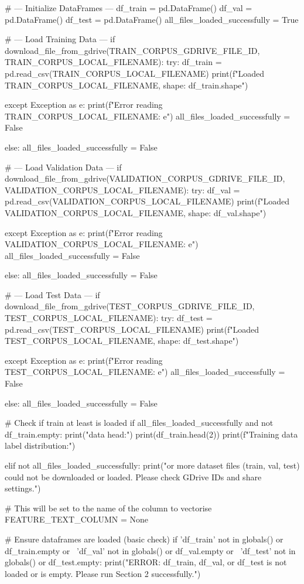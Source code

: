 \begin{ffcode}
# --- Initialize DataFrames ---
df_train = pd.DataFrame()
df_val = pd.DataFrame()
df_test = pd.DataFrame()
all_files_loaded_successfully = True

# --- Load Training Data ---
if download_file_from_gdrive(TRAIN_CORPUS_GDRIVE_FILE_ID, TRAIN_CORPUS_LOCAL_FILENAME):
    try:
        df_train = pd.read_csv(TRAIN_CORPUS_LOCAL_FILENAME)
        print(f"Loaded {TRAIN_CORPUS_LOCAL_FILENAME}, shape: {df_train.shape}")

    except Exception as e:
        print(f"Error reading {TRAIN_CORPUS_LOCAL_FILENAME}: {e}")
        all_files_loaded_successfully = False

else:
    all_files_loaded_successfully = False

# --- Load Validation Data ---
if download_file_from_gdrive(VALIDATION_CORPUS_GDRIVE_FILE_ID, VALIDATION_CORPUS_LOCAL_FILENAME):
    try:
        df_val = pd.read_csv(VALIDATION_CORPUS_LOCAL_FILENAME)
        print(f"Loaded {VALIDATION_CORPUS_LOCAL_FILENAME}, shape: {df_val.shape}")

    except Exception as e:
        print(f"Error reading {VALIDATION_CORPUS_LOCAL_FILENAME}: {e}")
        all_files_loaded_successfully = False

else:
    all_files_loaded_successfully = False

# --- Load Test Data ---
if download_file_from_gdrive(TEST_CORPUS_GDRIVE_FILE_ID, TEST_CORPUS_LOCAL_FILENAME):
    try:
        df_test = pd.read_csv(TEST_CORPUS_LOCAL_FILENAME)
        print(f"Loaded {TEST_CORPUS_LOCAL_FILENAME}, shape: {df_test.shape}")

    except Exception as e:
        print(f"Error reading {TEST_CORPUS_LOCAL_FILENAME}: {e}")
        all_files_loaded_successfully = False

else:
    all_files_loaded_successfully = False

# Check if train at least is loaded
if all_files_loaded_successfully and not df_train.empty:
    print("\nTraining data head:")
    print(df_train.head(2))
    print(f"Training data label distribution:")

elif not all_files_loaded_successfully:
    print("\nOne or more dataset files (train, val, test) could not be downloaded or loaded. Please check GDrive IDs and share settings.")

# This will be set to the name of the column to vectorise
FEATURE_TEXT_COLUMN = None

# Ensure dataframes are loaded (basic check)
if 'df_train' not in globals() or df_train.empty or \
    'df_val' not in globals() or df_val.empty or \
    'df_test' not in globals() or df_test.empty:
    print("ERROR: df_train, df_val, or df_test is not loaded or is empty. Please run Section 2 successfully.")


\end{ffcode}
